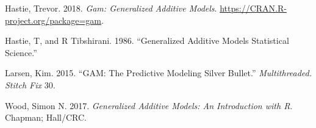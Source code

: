 \documentclass[]{ctexart}
\begin{document}
\hypertarget{refs}{}
\leavevmode\hypertarget{ref-Rgam}{}%
Hastie, Trevor. 2018. \emph{Gam: Generalized Additive Models}.
\url{https://CRAN.R-project.org/package=gam}.

\leavevmode\hypertarget{ref-hastie1986generalized}{}%
Hastie, T, and R Tibshirani. 1986. ``Generalized Additive Models
Statistical Science.''

\leavevmode\hypertarget{ref-larsen2015gam}{}%
Larsen, Kim. 2015. ``GAM: The Predictive Modeling Silver Bullet.''
\emph{Multithreaded. Stitch Fix} 30.

\leavevmode\hypertarget{ref-wood2017generalized}{}%
Wood, Simon N. 2017. \emph{Generalized Additive Models: An Introduction
with R}. Chapman; Hall/CRC.
\end{document}
